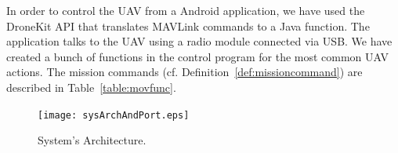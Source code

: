 \documentclass[12pt]{article}
\begin{document}
In order to control the UAV from a Android application, we have used the DroneKit API that translates MAVLink commands to a Java function. The application talks to the UAV using a radio module connected via USB. We have created a bunch of functions in the control program for the most common UAV actions. The mission commands (cf. Definition~\ref{def:missioncommand}) are described in Table~\ref{table:movfunc}.
%

\begin{table}[H]
\scriptsize
\centering
{}
\caption{Description of movement functions}
\label{table:movfunc}
\end{table}


\begin{figure}[H]
	\centering
	\texttt{[image: sysArchAndPort.eps]}
	\caption{System's Architecture.\label{fig:sysArch}}
\end{figure}
\end{document}
